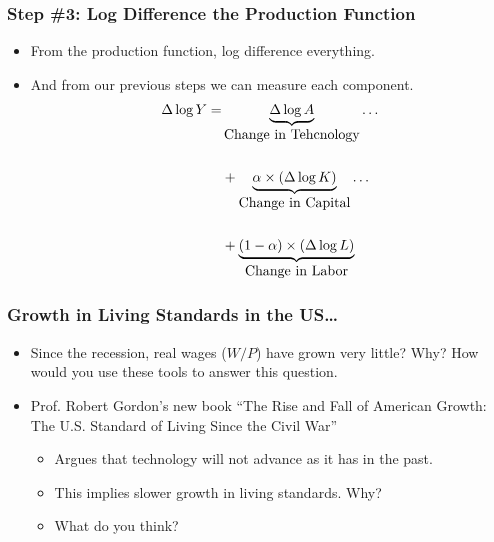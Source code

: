 \documentclass[handout]{beamer}
\begin{document}
\begin{frame}[t]
\frametitle{Step \#3: Log Difference the Production Function}
\begin{itemize}
\item From the production function, log difference everything. 
\medskip
\item And from our previous steps we can measure each component.
\begin{eqnarray*}
\Delta \log Y = & \underbrace{\Delta \log A}_{\mbox{Change in Tehcnology}} \dots \\
\\ 
& +  \underbrace{\alpha \times (\Delta \log K)}_{\mbox{Change in Capital}} \dots \\
\\
\vspace{1cm}
& + \underbrace{(1-\alpha)\times(\Delta \log L)}_{\mbox{Change in Labor}} 
\end{eqnarray*}
\end{itemize}
\end{frame}


\begin{frame}[t]
\frametitle{Growth in Living Standards in the US\ldots}
\begin{itemize}
\item Since the recession, real wages ($W/P$) have grown very little? Why? How would you use these tools to answer this question.
\bigskip
\item Prof. Robert Gordon's new book ``The Rise and Fall of American Growth: The U.S. Standard of Living Since the Civil War''
\begin{itemize}
\medskip
\item Argues that technology will not advance as it has in the past.
\medskip
\item This implies slower growth in living standards. Why?
\medskip
\item What do you think?
\end{itemize}
\end{itemize}
\end{frame}

\end{document}
